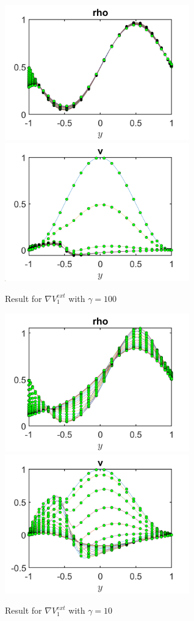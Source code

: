 \documentclass[11pt, a4paper]{article}
\theoremstyle{definition}
\begin{document}
\begin{figure}
	\includegraphics[width=8cm]{rho2.png}
	\includegraphics[width=8cm]{v2.png}
	\caption{Result for $\nabla V^{ext}_1 $ with $\gamma =100$}
	\label{Figure2}
\end{figure}
\begin{figure}
	\includegraphics[width=8cm]{rho3.png}
	\includegraphics[width=8cm]{v3.png}
	\caption{Result for $\nabla V^{ext}_1 $ with $\gamma =10$}
	\label{Figure3}
\end{figure}
\end{document}
